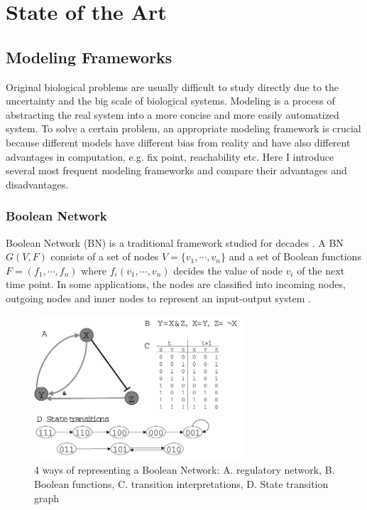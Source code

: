 \chapter{State of the Art}\label{chap:stateOfTheArt}

\section{Modeling Frameworks}
Original biological problems are usually difficult to study directly due to the uncertainty and the big scale of biological systems. 
Modeling is a process of abstracting the real system into a more concise and more easily automatized system.
To solve a certain problem, an appropriate modeling framework is crucial because different models have different bias from reality and have also different advantages in computation, e.g. fix point, reachability etc.
Here I introduce several most frequent modeling frameworks and compare their advantages and disadvantages.

\subsection{Boolean Network}
Boolean Network (BN) is a traditional framework studied for decades \cite{kauffman1969}.
A BN $G(V,F)$ consists of a set of nodes $V=\{v_1,\cdots,v_n\}$ and a set of Boolean functions $F=(f_1,\cdots,f_n)$ where $f_i(v_1,\cdots,v_n)$ decides the value of node $v_i$ of the next time point.
In some applications, the nodes are classified into incoming nodes, outgoing nodes and inner nodes to represent an input-output system \cite{akutsu2007control}.
\begin{figure}
    \centering
    \includegraphics[width=0.7\textwidth]{BooleanNetwork.png}
    \caption[Boolean Network]{4 ways of representing a Boolean Network: A. regulatory network, B. Boolean functions, C. transition interpretations, D. State transition graph}
    \label{fig:booleannetwork}
\end{figure}

